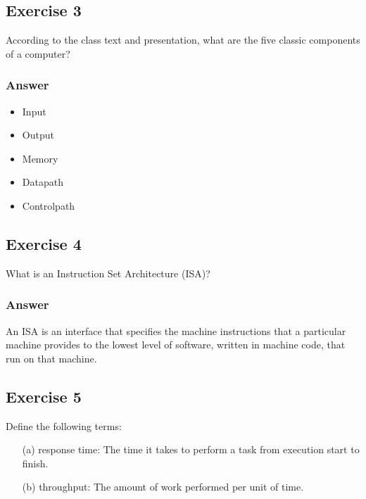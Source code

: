 \documentclass[12pt]{article}
\begin{document}
\subsection*{Exercise 3}
According to the class text and presentation, what are the five classic components of a computer?
\subsubsection*{Answer}
\begin{itemize}
\item Input
\item Output
\item Memory
\item Datapath
\item Controlpath
\end{itemize}

\subsection*{Exercise 4}
What is an Instruction Set Architecture (ISA)?
\subsubsection*{Answer}
An ISA is an interface that specifies the machine instructions that a particular machine provides to the lowest level of software, written in machine code, that run on that machine.

\subsection*{Exercise 5}
Define the following terms:
\begin{itemize}
\item[(a) response time:] The time it takes to perform a task from execution start to finish.
\item[(b) throughput:] The amount of work performed per unit of time.
\end{itemize}
\end{document}
